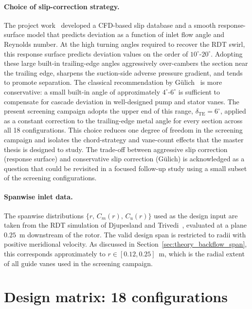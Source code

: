 \paragraph{Choice of slip-correction strategy.}
The project work~\cite{Leonsen2025} developed a CFD-based slip database and a smooth response-surface model that predicts deviation as a function of inlet flow angle and Reynolds number. At the high turning angles required to recover the RDT swirl, this response surface predicts deviation values on the order of $10^\circ$-$20^\circ$. Adopting these large built-in trailing-edge angles aggressively over-cambers the section near the trailing edge, sharpens the suction-side adverse pressure gradient, and tends to promote separation. The classical recommendation by G\"ulich~\cite{Gulich2010} is more conservative: a small built-in angle of approximately $4^\circ$-$6^\circ$ is sufficient to compensate for cascade deviation in well-designed pump and stator vanes. The present screening campaign adopts the upper end of this range, $\delta_{\mathrm{TE}} = 6^\circ$, applied as a constant correction to the trailing-edge metal angle for every section across all 18 configurations. This choice reduces one degree of freedom in the screening campaign and isolates the chord-strategy and vane-count effects that the master thesis is designed to study. The trade-off between aggressive slip correction (response surface) and conservative slip correction (G\"ulich) is acknowledged as a question that could be revisited in a focused follow-up study using a small subset of the screening configurations.
 
\paragraph{Spanwise inlet data.}
The spanwise distributions $\{r,\,C_m(r),\,C_u(r)\}$ used as the design input are taken from the RDT simulation of Djupesland and Trivedi~\cite{DjupeslandTrivedi2025}, evaluated at a plane $0.25$~m downstream of the rotor. The valid design span is restricted to radii with positive meridional velocity. As discussed in Section~\ref{sec:theory_backflow_span}, this corresponds approximately to $r \in [0.12, 0.25]$~m, which is the radial extent of all guide vanes used in the screening campaign.
 
\section{Design matrix: 18 configurations}
\label{sec:methods_design_matrix}
 
